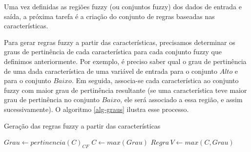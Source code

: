 Uma vez definidas as regiões fuzzy (ou conjuntos fuzzy) dos dados de entrada e saída, a próxima tarefa é a criação do conjunto de regras baseadas nas características. %
%


Para gerar regras fuzzy a partir das características, precisamos determinar os graus de pertinência de cada característica para cada conjunto fuzzy que definimos anteriormente. Por exemplo, é preciso saber qual o grau de pertinência de uma dada característica de uma variável de entrada para o conjunto $Alto$ e para o conjunto $Baixo$. Em seguida, associa-se cada característica ao conjunto fuzzy com maior grau de pertinência resultante (se uma característica teve maior grau de pertinência no conjunto $Baixo$, ele será associado a essa região, e assim sucessivamente). O algoritmo \ref{alg-graus} ilustra esse processo. 

\begin{algorithm}
\begin{algorithmic}[1]
\caption{Geração das regras fuzzy a partir das características}
\label{alg-graus}
      \STATE $Grau \leftarrow pertinencia(C)_{CF}$
      \ENDFOR
   \STATE $C \leftarrow max(Grau) $
   \ENDFOR
   \STATE $Regra \, V \leftarrow max(C, Grau) $
\ENDFOR
\end{algorithmic}
\end{algorithm}

